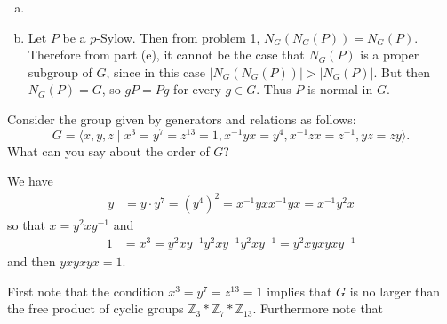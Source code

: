 \documentclass{article}
\newcounter{Problem}
\newenvironment{Problem}{\begin{Exercise}[name={Problem},
                                          counter={Problem}]}
                        {\end{Exercise}}
\begin{document}
\begin{Answer}
\begin{enumerate}[(a)]
{%
%
  }
  \item{
  }
  \item{
    Let $P$ be a $p$-Sylow. Then from problem 1, $N_G(N_G(P)) =
    N_G(P)$. Therefore from part (e), it cannot be the case that
    $N_G(P)$ is a proper subgroup of $G$, since in this case
    $|N_G(N_G(P))| > |N_G(P)|$. But then $N_G(P) = G$, so $gP = Pg$
    for every $g \in G$. Thus $P$ is normal in $G$.
  }
\end{enumerate}
\end{Answer}

\pagebreak

\begin{Problem}
Consider the group given by generators and relations as follows:
$$
G = \langle
      x, y, z
    \mid
      x^3 = y^7 = z^{13} = 1,
      x^{-1} y x = y^4,
      x^{-1} z x = z^{-1},
      yz = zy
    \rangle.
$$
What can you say about the order of $G$?
\end{Problem}

\begin{Answer}
We have
\begin{align*}
   y
&= y \cdot y^7
 = (y^4)^2
 = x^{-1} y x x^{-1} y x
 = x^{-1} y^2 x
\end{align*}
so that $x = y^2 x y^{-1}$ and
\begin{align*}
   1
&= x^3
 = y^2 x y^{-1} y^2 x y^{-1} y^2 x y^{-1}
 = y^2 x y x y x y^{-1}
\end{align*}
and then $yxyxyx = 1$.

First note that the condition $x^3 = y^7 = z^{13} = 1$ implies that
$G$ is no larger than the free product of cyclic groups
$\mathbb{Z}_3 \ast \mathbb{Z}_7 \ast \mathbb{Z}_{13}$. Furthermore
note that
\end{Answer}

\pagebreak
\end{document}
